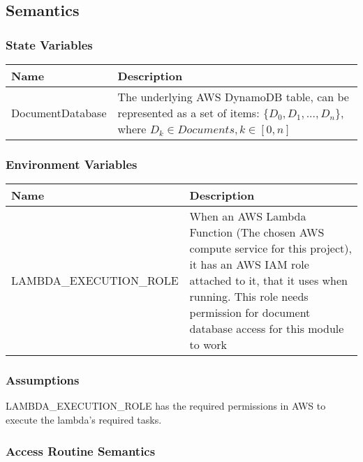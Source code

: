 \documentclass[12pt, titlepage]{article}
\begin{document}
  \subsection{Semantics}

  \subsubsection{State Variables}

  \begin{center}
    \begin{tabular}{p{4cm} p{12cm}}
      \hline
      \textbf{Name} & \textbf{Description} \\
      \hline
      DocumentDatabase & The underlying AWS DynamoDB table, can be
      represented as a set of items: $\{D_0, D_1, ..., D_n\}$, where
      $D_k \in Documents, k\in[0,n]$ \\
      \hline
    \end{tabular}
  \end{center}

  \subsubsection{Environment Variables}

  \begin{center}
    \begin{tabular}{p{6cm} p{10cm}}
      \hline
      \textbf{Name} & \textbf{Description} \\
      \hline
      LAMBDA\_EXECUTION\_ROLE & When an AWS Lambda Function (The chosen
      AWS compute service for this project), it has an AWS IAM role
      attached to it, that it uses when running. This role needs
      permission for document database access for this module to work \\
      \hline
    \end{tabular}
  \end{center}

  \subsubsection{Assumptions}

  LAMBDA\_EXECUTION\_ROLE has the required permissions in AWS to
  execute the lambda's required tasks.

  \subsubsection{Access Routine Semantics}
\end{document}
